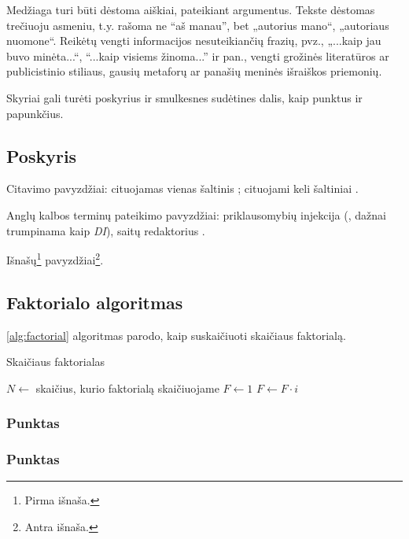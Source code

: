 \documentclass{VUMIFPSbakalaurinis}
\begin{document}
Medžiaga turi būti dėstoma aiškiai, pateikiant argumentus. Tekste dėstomas
trečiuoju asmeniu, t.y. rašoma ne \enquote{aš manau}, bet „autorius mano“, „autoriaus
nuomone“. Reikėtų vengti informacijos nesuteikiančių frazių, pvz., „...kaip jau
buvo minėta...“, \enquote{...kaip visiems žinoma...} ir pan., vengti grožinės
literatūros ar publicistinio stiliaus, gausių metaforų ar panašių meninės
išraiškos priemonių.

Skyriai gali turėti poskyrius ir smulkesnes sudėtines dalis, kaip punktus ir
papunkčius.

\subsection{Poskyris}
Citavimo pavyzdžiai: cituojamas vienas šaltinis \cite{PvzStraipsnLt}; cituojami
keli šaltiniai \cite{PvzStraipsnEn, PvzStraipsnLta, PvzKonfLt, PvzKonfEn, PvzKnygLt, PvzKnygEn,
PvzElPubLt, PvzElPubEn, PvzBakLt, PvzMagistrLt, PvzPhdEn}.

Anglų kalbos terminų pateikimo pavyzdžiai: priklausomybių injekcija (,
dažnai trumpinama kaip \textit{DI}), saitų redaktorius .

Išnašų\footnote{Pirma išnaša.} pavyzdžiai\footnote{Antra išnaša.}.

\subsection{Faktorialo algoritmas}

\ref{alg:factorial} algoritmas parodo, kaip suskaičiuoti skaičiaus faktorialą.

\begin{algorithm}
\caption{Skaičiaus faktorialas}
\begin{algorithmic}[1] %
\State $N\gets$ skaičius, kurio faktorialą skaičiuojame
\State $F\gets 1$
    \State $F\gets F \cdot i$
\EndFor
\end{algorithmic}
\label{alg:factorial}
\end{algorithm}

\subsubsection{Punktas}
\subsubsection{Punktas}
\end{document}
